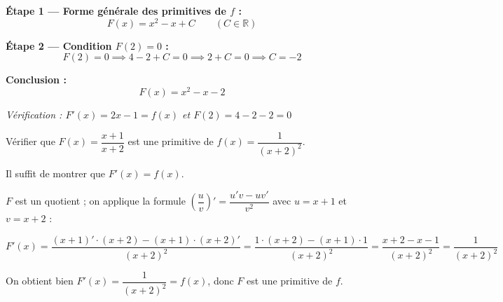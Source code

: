 \documentclass[a4paper,11pt]{article}
\begin{document}
\vfill

\begin{tcolorbox}[corrigebox]
  \textbf{Étape 1 — Forme générale des primitives de $f$ :}
  \[
    F(x) = x^2 - x + C \qquad (C \in \mathbb{R})
  \]

  \textbf{Étape 2 — Condition $F(2) = 0$ :}
  \[
    F(2) = 0 \implies 4 - 2 + C = 0 \implies 2 + C = 0 \implies C = -2
  \]

  \textbf{Conclusion :}
  \[
    \boxed{F(x) = x^2 - x - 2}
  \]

  \textit{Vérification : $F'(x) = 2x - 1 = f(x)$ \checkmark \quad et \quad $F(2) = 4 - 2 - 2 = 0$ \checkmark}
\end{tcolorbox}

\vfill

\begin{tcolorbox}[exobox={Exercice 4 \quad La primitive est donnée \hfill \normalfont\textit{(1 point)}}]
  Vérifier que $F(x) = \dfrac{x+1}{x+2}$ est une primitive de $f(x) = \dfrac{1}{(x+2)^2}$.
\end{tcolorbox}

\vfill

\begin{tcolorbox}[corrigebox]
  Il suffit de montrer que $F'(x) = f(x)$.

  $F$ est un quotient ; on applique la formule $\left(\dfrac{u}{v}\right)' = \dfrac{u'v - uv'}{v^2}$ avec $u = x+1$ et $v = x+2$ :

  \[
    F'(x) = \frac{(x+1)' \cdot (x+2) - (x+1) \cdot (x+2)'}{(x+2)^2}
           = \frac{1 \cdot (x+2) - (x+1) \cdot 1}{(x+2)^2}
           = \frac{x + 2 - x - 1}{(x+2)^2}
           = \frac{1}{(x+2)^2}
  \]

  On obtient bien $F'(x) = \dfrac{1}{(x+2)^2} = f(x)$, donc $F$ est une primitive de $f$. \checkmark
\end{tcolorbox}

\vfill
\end{document}
